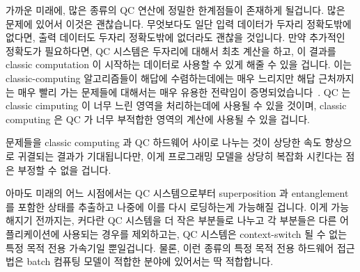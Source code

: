 가까운 미래에, 많은 종류의 QC 연산에 정밀한 한계점들이 존재하게 될겁니다.
많은 문제에 있어서 이것은 괜찮습니다.
무엇보다도 일단 입력 데이터가 두자리 정확도밖에 없다면, 출력 데이터도 두자리
정확도밖에 없더라도 괜찮을 것입니다.
만약 추가적인 정확도가 필요하다면, QC 시스템은 두자리에 대해서 최초 계산을
하고, 이 결과를 classic computation 이 시작하는 데이터로 사용할 수 있게 해줄 수
있을 겁니다.
이는 classic-computing 알고리즘들이 해답에 수렴하는데에는 매우 느리지만 해답
근처까지는 매우 빨리 가는 문제들에 대해서는 매우 유용한 전략임이
증명되었습니다~\cite{JakubKurzak2007MixedPrecision}.
QC 는 classic cimputing 이 너무 느린 영역을 처리하는데에 사용될 수 있을 것이며,
classic computing 은 QC 가 너무 부적합한 영역의 계산에 사용될 수 있을 겁니다.

문제들을 classic computing 과 QC 하드웨어 사이로 나누는 것이 상당한 속도
향상으로 귀결되는 결과가 기대됩니다만, 이게 프로그래밍 모델을 상당히 복잡화
시킨다는 점은 부정할 수 없을 겁니다.

아마도 미래의 어느 시점에서는 QC 시스템으로부터 superposition 과 entanglement
를 포함한 상태를 추출하고 나중에 이를 다시 로딩하는게 가능해질 겁니다.
이게 가능해지기 전까지는, 커다란 QC 시스템을 더 작은 부분들로 나누고 각
부분들은 다른 어플리케이션에 사용되는 경우를 제외하고는, QC 시스템은
context-switch 될 수 없는 특정 목적 전용 가속기일 뿐일겁니다.
물론, 이런 종류의 특정 목적 전용 하드웨어 접근법은 batch 컴퓨팅 모델이 적합한
분야에 있어서는 딱 적합합니다.

